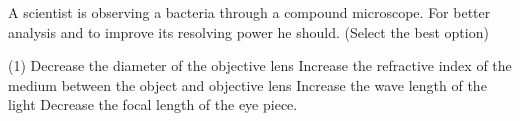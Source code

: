\item A scientist is observing a bacteria through a compound microscope. For better analysis and to improve its resolving power he should. (Select the best option)
    \begin{tasks}(1)
        \task Decrease the diameter of the objective lens
        \task Increase the refractive index of the medium between the object and objective lens
        \task Increase the wave length of the light
        \task Decrease the focal length of the eye piece.
    \end{tasks}